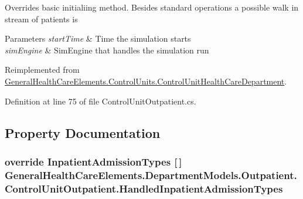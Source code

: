 Overrides basic initialiing method. Besides standard operations a possible walk in stream of patients is 


\begin{DoxyParams}{Parameters}
{\em start\+Time} & Time the simulation starts\\
\hline
{\em sim\+Engine} & Sim\+Engine that handles the simulation run\\
\hline
\end{DoxyParams}


Reimplemented from \hyperlink{class_general_health_care_elements_1_1_control_units_1_1_control_unit_health_care_department_a44dd8b92cd74878a9a237e9050533c94}{General\+Health\+Care\+Elements.\+Control\+Units.\+Control\+Unit\+Health\+Care\+Department}.



Definition at line 75 of file Control\+Unit\+Outpatient.\+cs.



\subsection{Property Documentation}
\subsubsection[{\texorpdfstring{Handled\+Inpatient\+Admission\+Types}{HandledInpatientAdmissionTypes}}]{\setlength{\rightskip}{0pt plus 5cm}override {\bf Inpatient\+Admission\+Types} \mbox{[}$\,$\mbox{]} General\+Health\+Care\+Elements.\+Department\+Models.\+Outpatient.\+Control\+Unit\+Outpatient.\+Handled\+Inpatient\+Admission\+Types\hspace{0.3cm}{\ttfamily [get]}}\hypertarget{class_general_health_care_elements_1_1_department_models_1_1_outpatient_1_1_control_unit_outpatient_afc1ac3cf602c8c0f2265ad08d79cccde}{}\label{class_general_health_care_elements_1_1_department_models_1_1_outpatient_1_1_control_unit_outpatient_afc1ac3cf602c8c0f2265ad08d79cccde}


